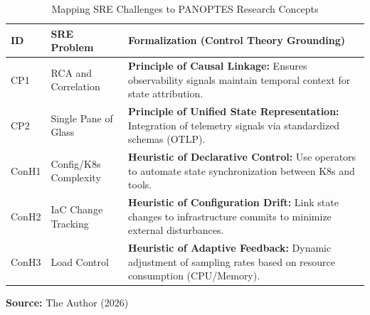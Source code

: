 \begin{table}[ht]
\centering
\caption{Mapping SRE Challenges to PANOPTES Research Concepts}
\label{tab:sre-mapping}
\begin{tabularx}{\textwidth}{|l|p{3cm}|X|}
\hline
\textbf{ID} & \textbf{SRE Problem} & \textbf{Formalization (Control Theory Grounding)} \\ \hline
CP1 & RCA and Correlation & \textbf{Principle of Causal Linkage:} Ensures observability signals maintain temporal context for state attribution. \\ \hline
CP2 & Single Pane of Glass & \textbf{Principle of Unified State Representation:} Integration of telemetry signals via standardized schemas (OTLP). \\ \hline
ConH1 & Config/K8s Complexity & \textbf{Heuristic of Declarative Control:} Use operators to automate state synchronization between K8s and tools. \\ \hline
ConH2 & IaC Change Tracking & \textbf{Heuristic of Configuration Drift:} Link state changes to infrastructure commits to minimize external disturbances. \\ \hline
ConH3 & Load Control & \textbf{Heuristic of Adaptive Feedback:} Dynamic adjustment of sampling rates based on resource consumption (CPU/Memory). \\ \hline
\end{tabularx}
\par\medskip\ABNTEXfontereduzida\selectfont\textbf{Source:} The Author (2026) \par\medskip
\end{table}